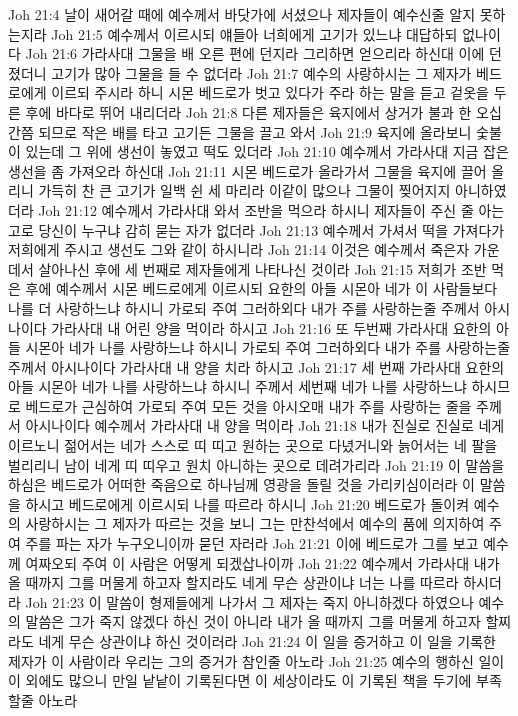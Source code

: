 Joh 21:4  날이 새어갈 때에 예수께서 바닷가에 서셨으나 제자들이 예수신줄 알지 못하는지라
Joh 21:5  예수께서 이르시되 얘들아 너희에게 고기가 있느냐 대답하되 없나이다
Joh 21:6  가라사대 그물을 배 오른 편에 던지라 그리하면 얻으리라 하신대 이에 던졌더니 고기가 많아 그물을 들 수 없더라
Joh 21:7  예수의 사랑하시는 그 제자가 베드로에게 이르되 주시라 하니 시몬 베드로가 벗고 있다가 주라 하는 말을 듣고 겉옷을 두른 후에 바다로 뛰어 내리더라
Joh 21:8  다른 제자들은 육지에서 상거가 불과 한 오십 간쯤 되므로 작은 배를 타고 고기든 그물을 끌고 와서
Joh 21:9  육지에 올라보니 숯불이 있는데 그 위에 생선이 놓였고 떡도 있더라
Joh 21:10  예수께서 가라사대 지금 잡은 생선을 좀 가져오라 하신대
Joh 21:11  시몬 베드로가 올라가서 그물을 육지에 끌어 올리니 가득히 찬 큰 고기가 일백 쉰 세 마리라 이같이 많으나 그물이 찢어지지 아니하였더라
Joh 21:12  예수께서 가라사대 와서 조반을 먹으라 하시니 제자들이 주신 줄 아는 고로 당신이 누구냐 감히 묻는 자가 없더라
Joh 21:13  예수께서 가셔서 떡을 가져다가 저희에게 주시고 생선도 그와 같이 하시니라
Joh 21:14  이것은 예수께서 죽은자 가운데서 살아나신 후에 세 번째로 제자들에게 나타나신 것이라
Joh 21:15  저희가 조반 먹은 후에 예수께서 시몬 베드로에게 이르시되 요한의 아들 시몬아 네가 이 사람들보다 나를 더 사랑하느냐 하시니 가로되 주여 그러하외다 내가 주를 사랑하는줄 주께서 아시나이다 가라사대 내 어린 양을 먹이라 하시고
Joh 21:16  또 두번째 가라사대 요한의 아들 시몬아 네가 나를 사랑하느냐 하시니 가로되 주여 그러하외다 내가 주를 사랑하는줄 주께서 아시나이다 가라사대 내 양을 치라 하시고
Joh 21:17  세 번째 가라사대 요한의 아들 시몬아 네가 나를 사랑하느냐 하시니 주께서 세번째 네가 나를 사랑하느냐 하시므로 베드로가 근심하여 가로되 주여 모든 것을 아시오매 내가 주를 사랑하는 줄을 주께서 아시나이다 예수께서 가라사대 내 양을 먹이라
Joh 21:18  내가 진실로 진실로 네게 이르노니 젊어서는 네가 스스로 띠 띠고 원하는 곳으로 다녔거니와 늙어서는 네 팔을 벌리리니 남이 네게 띠 띠우고 원치 아니하는 곳으로 데려가리라
Joh 21:19  이 말씀을 하심은 베드로가 어떠한 죽음으로 하나님께 영광을 돌릴 것을 가리키심이러라 이 말씀을 하시고 베드로에게 이르시되 나를 따르라 하시니
Joh 21:20  베드로가 돌이켜 예수의 사랑하시는 그 제자가 따르는 것을 보니 그는 만찬석에서 예수의 품에 의지하여 주여 주를 파는 자가 누구오니이까 묻던 자러라
Joh 21:21  이에 베드로가 그를 보고 예수께 여짜오되 주여 이 사람은 어떻게 되겠삽나이까
Joh 21:22  예수께서 가라사대 내가 올 때까지 그를 머물게 하고자 할지라도 네게 무슨 상관이냐 너는 나를 따르라 하시더라
Joh 21:23  이 말씀이 형제들에게 나가서 그 제자는 죽지 아니하겠다 하였으나 예수의 말씀은 그가 죽지 않겠다 하신 것이 아니라 내가 올 때까지 그를 머물게 하고자 할찌라도 네게 무슨 상관이냐 하신 것이러라
Joh 21:24  이 일을 증거하고 이 일을 기록한 제자가 이 사람이라 우리는 그의 증거가 참인줄 아노라
Joh 21:25  예수의 행하신 일이 이 외에도 많으니 만일 낱낱이 기록된다면 이 세상이라도 이 기록된 책을 두기에 부족할줄 아노라


